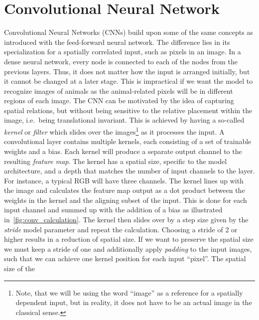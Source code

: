 \section{Convolutional Neural Network}\label{sec:CNN}


Convolutional Neural Networks (\acrshort{CNN}s) build upon some of the same
concepts as introduced with the feed-forward neural network. The difference lies
in its specialization for a spatially correlated input, such as pixels in an
image. In a dense neural network, every node is connected to each of the nodes
from the previous layers. Thus, it does not matter how the input is arranged
initially, but it cannot be changed at a later stage. This is
impractical if we want the model to recognize images of animals as the
animal-related pixels will be in different regions of each image. The
\acrshort{CNN} can be motivated by the idea of capturing spatial relations, but without being sensitive to the relative placement within the image, i.e.\ being
translational invariant. This is achieved by having a so-called \textit{kernel}
or \textit{filter} which slides over the images\footnote{Note,
that we will be using the word ``image'' as a reference for a spatially
dependent input, but in reality, it does not have to be an actual image in the
classical sense.} as it processes the input. A convolutional layer contains multiple kernels, each
consisting of a set of trainable weights and a bias. Each kernel will produce a separate output channel to the resulting \textit{feature map}. The kernel has a spatial size, specific to the model architecture, and a depth that matches the number of input channels to the layer. For instance, a typical RGB will have three channels. The kernel lines up with the image and calculates the feature map output as a dot product between the weights in the kernel and the aligning subset of the input. This is done for each input channel and summed up with the addition of a bias as illustrated in~\cref{fig:conv_calculation}. The kernel then slides over by a step size given by the \textit{stride} model parameter and repeat the calculation. Choosing a stride of 2 or higher results in a reduction of spatial size. If we want to preserve the spatial size we must keep a stride of one and
additionally apply \textit{padding} to the input images, such that we can
achieve one kernel position for each input ``pixel''. The spatial size of the
